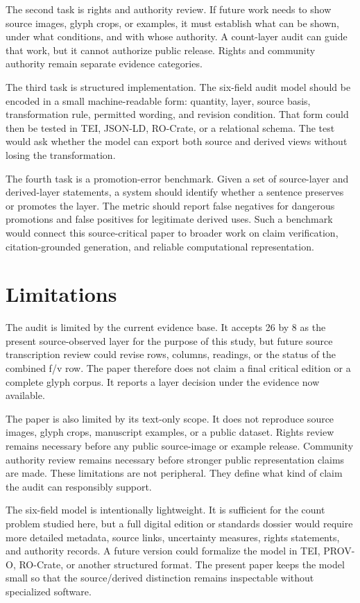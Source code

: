 \documentclass[sigconf,nonacm]{acmart}
\begin{document}
The second task is rights and authority review. If future work needs to show
source images, glyph crops, or examples, it must establish what can be shown,
under what conditions, and with whose authority. A count-layer audit can guide
that work, but it cannot authorize public release. Rights and community
authority remain separate evidence categories.

The third task is structured implementation. The six-field audit model should be
encoded in a small machine-readable form: quantity, layer, source basis,
transformation rule, permitted wording, and revision condition. That form could
then be tested in TEI, JSON-LD, RO-Crate, or a relational schema. The test would
ask whether the model can export both source and derived views without losing
the transformation.

The fourth task is a promotion-error benchmark. Given a set of source-layer and
derived-layer statements, a system should identify whether a sentence preserves
or promotes the layer. The metric should report false negatives for dangerous
promotions and false positives for legitimate derived uses. Such a benchmark
would connect this source-critical paper to broader work on claim verification,
citation-grounded generation, and reliable computational representation.

\section{Limitations}
The audit is limited by the current evidence base. It accepts 26 by 8 as the
present source-observed layer for the purpose of this study, but future source
transcription review could revise rows, columns, readings, or the status of the
combined f/v row. The paper therefore does not claim a final critical edition
or a complete glyph corpus. It reports a layer decision under the evidence now
available.

The paper is also limited by its text-only scope. It does not reproduce source
images, glyph crops, manuscript examples, or a public dataset. Rights review
remains necessary before any public source-image or example release. Community
authority review remains necessary before stronger public representation claims
are made. These limitations are not peripheral. They define what kind of claim
the audit can responsibly support.

The six-field model is intentionally lightweight. It is sufficient for the
count problem studied here, but a full digital edition or standards dossier
would require more detailed metadata, source links, uncertainty measures,
rights statements, and authority records. A future version could formalize the
model in TEI, PROV-O, RO-Crate, or another structured format. The present paper
keeps the model small so that the source/derived distinction remains inspectable
without specialized software.
\end{document}
